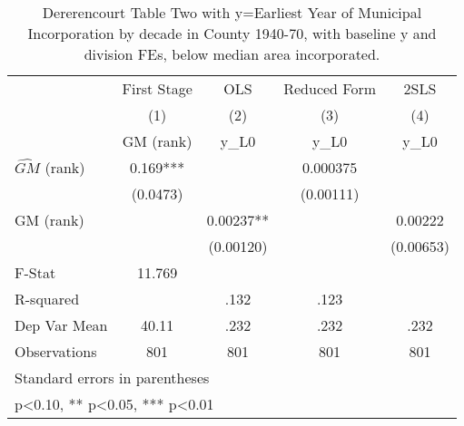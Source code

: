 \begin{table}[htbp]\centering
\def\sym#1{\ifmmode^{#1}\else\(^{#1}\)\fi}
\caption{Dererencourt Table Two with y=Earliest Year of Municipal Incorporation by decade in County 1940-70, with baseline y and division FEs, below median area incorporated.}
\begin{tabular}{l*{4}{c}}
\toprule
                    & First Stage   &         OLS   &Reduced Form   &        2SLS   \\
                    &\multicolumn{1}{c}{(1)}&\multicolumn{1}{c}{(2)}&\multicolumn{1}{c}{(3)}&\multicolumn{1}{c}{(4)}\\
                    &\multicolumn{1}{c}{GM  (rank)}&\multicolumn{1}{c}{y\_L0}&\multicolumn{1}{c}{y\_L0}&\multicolumn{1}{c}{y\_L0}\\
\midrule
$\hat{GM}$ (rank)   &       0.169***&               &    0.000375   &               \\
                    &    (0.0473)   &               &   (0.00111)   &               \\
\addlinespace
GM  (rank)          &               &     0.00237** &               &     0.00222   \\
                    &               &   (0.00120)   &               &   (0.00653)   \\
\midrule
F-Stat              &      11.769   &               &               &               \\
R-squared           &               &        .132   &        .123   &               \\
Dep Var Mean        &       40.11   &        .232   &        .232   &        .232   \\
Observations        &         801   &         801   &         801   &         801   \\
\bottomrule
\multicolumn{5}{l}{\footnotesize Standard errors in parentheses}\\
\multicolumn{5}{l}{\footnotesize * p<0.10, ** p<0.05, *** p<0.01}\\
\end{tabular}
\end{table}
